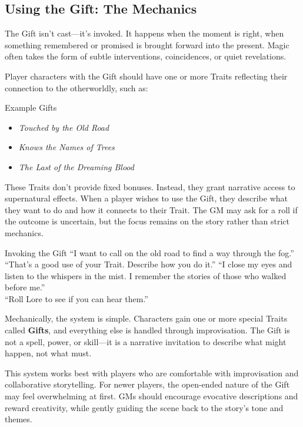 \subsection{Using the Gift: The Mechanics}

The Gift isn’t cast—it’s invoked. It happens when the moment is right, when something remembered or promised is brought forward into the present. Magic often takes the form of subtle interventions, coincidences, or quiet revelations.

Player characters with the Gift should have one or more Traits reflecting their connection to the otherworldly, such as:

\begin{Example}{Example Gifts}
    \begin{itemize}
        \item \textit{Touched by the Old Road}  
        \item \textit{Knows the Names of Trees}  
        \item \textit{The Last of the Dreaming Blood}  
    \end{itemize}
\end{Example}

These Traits don’t provide fixed bonuses. Instead, they grant narrative access to supernatural effects. When a player wishes to use the Gift, they describe what they want to do and how it connects to their Trait. The GM may ask for a roll if the outcome is uncertain, but the focus remains on the story rather than strict mechanics.

\begin{ExampleGame}{Invoking the Gift}
    \line[Player] “I want to call on the old road to find a way through the fog.”
    \line[GM]     “That’s a good use of your Trait. Describe how you do it.”
    \line[Player] “I close my eyes and listen to the whispers in the mist. I remember the stories of those who walked before me.”  \\
    \line[GM]     “Roll Lore to see if you can hear them.”
\end{ExampleGame}

Mechanically, the system is simple. Characters gain one or more special Traits called \textbf{Gifts}, and everything else is handled through improvisation. The Gift is not a spell, power, or skill—it is a narrative invitation to describe what might happen, not what must.

This system works best with players who are comfortable with improvisation and collaborative storytelling. For newer players, the open-ended nature of the Gift may feel overwhelming at first. GMs should encourage evocative descriptions and reward creativity, while gently guiding the scene back to the story's tone and themes.

